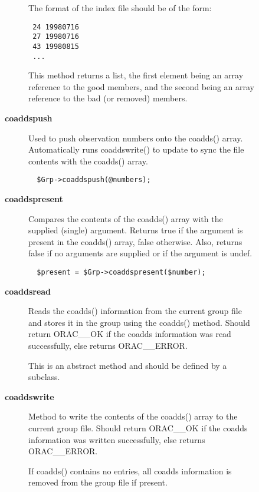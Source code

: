 \begin{description}
\begin{description}
\begin{description}
The format of the index file should be of the form:

\begin{verbatim}
 24 19980716
 27 19980716
 43 19980815
 ...
\end{verbatim}


This method returns a list, the first element being an array reference
to the good members, and the second being an array reference to the
bad (or removed) members.


\item[{\textbf{coaddspush}}] \mbox{}

Used to push observation numbers onto the coadds() array. Automatically
runs coaddswrite() to update to sync the file contents with the coadds()
array.

\begin{verbatim}
  $Grp->coaddspush(@numbers);
\end{verbatim}

\item[{\textbf{coaddspresent}}] \mbox{}

Compares the contents of the coadds() array with the supplied (single)
argument. Returns true if the argument is present in the coadds()
array, false otherwise. Also, returns false if no arguments are supplied
or if the argument is undef.

\begin{verbatim}
  $present = $Grp->coaddspresent($number);
\end{verbatim}

\item[{\textbf{coaddsread}}] \mbox{}

Reads the coadds() information from the current group file and stores
it in the group using the coadds() method.
Should return ORAC\_\_OK if the coadds information was read successfully,
else returns ORAC\_\_ERROR.



This is an abstract method and should be defined by a subclass.


\item[{\textbf{coaddswrite}}] \mbox{}

Method to write the contents of the coadds() array to the current
group file. Should return ORAC\_\_OK if the coadds information was written
successfully, else returns ORAC\_\_ERROR.



If coadds() contains no entries, all coadds information is removed from
the group file if present.




\end{description}
\end{description}
\end{description}
